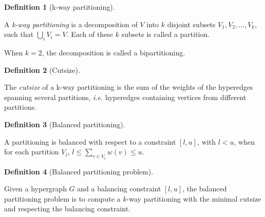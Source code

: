 \documentclass[11pt,a4paper]{report} %
\theoremstyle{customdef}
\newtheorem{definition}{Definition}
\newenvironment{defi}[2]
 {\begin{definition}[#1]\label{#2}\end{definition}\begin{siderules}}
 {\end{siderules}}
\begin{document}
\begin{defi}{k-way partitioning}{def:k-way-part}
A \emph{k-way partitioning} is a decomposition of $V$ into $k$ disjoint subsets $V_1, V_2, ... , V_k$, such that $\bigcup_i V_i = V$.
Each of these $k$ subsets is called a partition.

When $k = 2$, the decomposition is called a bipartitioning.
\end{defi}

\begin{defi}{Cutsize}{def:cutsize}
The \textit{cutsize} of a k-way partitioning is the sum of the weights of the hyperedges spanning several partitions, \textit{i.e.} hyperedges containing vertices from different partitions.
\end{defi}

\begin{defi}{Balanced partitioning}
A A partitioning is balanced with respect to a constraint $[l, u]$, with $l < u$, when for each partition $V_i$, $l \leq \sum_{v \in V_i} w(v) \leq u$.
\end{defi}

\begin{defi}{Balanced partitioning problem}
GGiven a hypergraph $G$ and a balancing constraint $[l, u]$, the balanced partitioning problem is to compute a $k$-way partitioning with the minimal cutsize and respecting the balancing constraint.
\end{defi}




\end{document}
